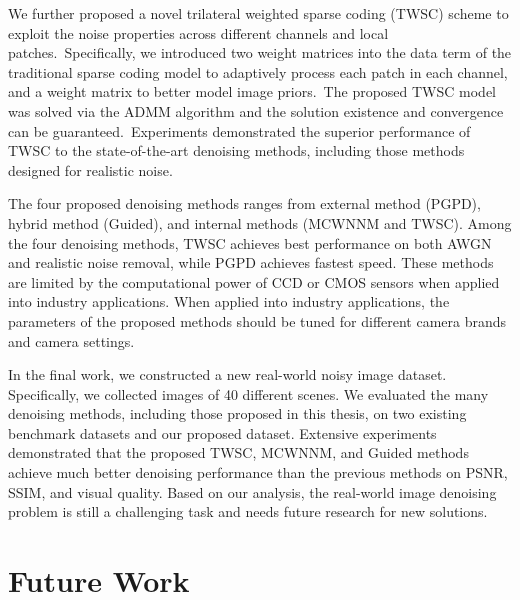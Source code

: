 We further proposed a novel trilateral weighted sparse coding (TWSC) scheme to exploit the noise properties across different channels and local patches.\ Specifically, we introduced two weight matrices into the data term of the traditional sparse coding model to adaptively process each patch in each channel, and a weight matrix to better model image priors.\ The proposed TWSC model was solved via the ADMM algorithm and the solution existence and convergence can be guaranteed.\ Experiments demonstrated the superior performance of TWSC to the state-of-the-art denoising methods, including those methods designed for realistic noise.

The four proposed denoising methods ranges from external method (PGPD), hybrid method (Guided), and internal methods (MCWNNM and TWSC). Among the four denoising methods, TWSC achieves best performance on both AWGN and realistic noise removal, while PGPD achieves fastest speed. These methods are limited by the computational power of CCD or CMOS sensors when applied into industry applications. When applied into industry applications, the parameters of the proposed methods should be tuned for different camera brands and camera settings.

In the final work, we constructed a new real-world noisy image dataset. Specifically, we collected images of 40 different scenes. We evaluated the many denoising methods, including those proposed in this thesis, on two existing benchmark datasets and our proposed dataset. Extensive experiments demonstrated that the proposed TWSC, MCWNNM, and Guided methods achieve much better denoising performance than the previous methods on PSNR, SSIM, and visual quality. Based on our analysis, the real-world image denoising problem is still a challenging task and needs future research for new solutions.

\section{Future Work}
\vspace{-3mm}
\label{sec:conclusions:future}

